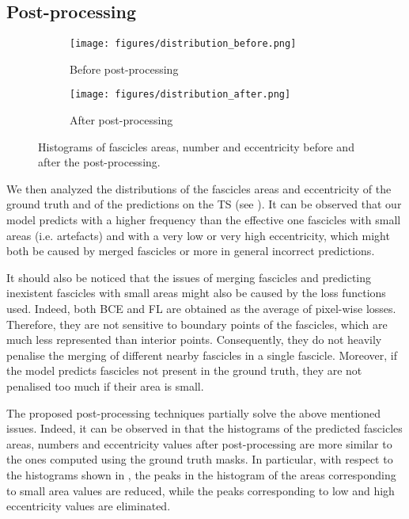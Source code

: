 \documentclass[conference]{IEEEtran}
\begin{document}
\subsection{Post-processing}

\begin{figure}[]
\begin{subfigure}{1\linewidth}
\centering
\texttt{[image: figures/distribution\_before.png]}
\caption{Before post-processing}
\label{fig:before}
\end{subfigure}
\begin{subfigure}{1\linewidth}
\centering
\texttt{[image: figures/distribution\_after.png]}
\caption{After post-processing}
\label{fig:after}
\end{subfigure}
\caption{Histograms of fascicles areas, number and eccentricity before and after the post-processing.}
\label{fig:histograms}
\end{figure}

We then analyzed the distributions of the fascicles areas and eccentricity of the ground truth and of the predictions on the TS (see ). It can be observed that our model predicts with a higher frequency than the effective one fascicles with small areas (i.e. artefacts) and with a very low or very high eccentricity, which might both be caused by merged fascicles or more in general incorrect predictions.

It should also be noticed that the issues of merging fascicles and predicting inexistent fascicles with small areas might also be caused by the loss functions used. Indeed, both BCE and FL are obtained as the average of pixel-wise losses. Therefore, they are not sensitive to boundary points of the fascicles, which are much less represented than interior points. Consequently, they do not heavily penalise the merging of different nearby fascicles in a single fascicle. Moreover, if the model predicts fascicles not present in the ground truth, they are not penalised too much if their area is small.

The proposed post-processing techniques partially solve the above mentioned issues. Indeed, it can be observed in  that the histograms of the predicted fascicles areas, numbers and eccentricity values after post-processing are more similar to the ones computed using the ground truth masks. In particular, with respect to the histograms shown in ,  the peaks in the histogram of the areas corresponding to small area values are reduced, while the peaks corresponding to low and high eccentricity values are eliminated.
\end{document}
